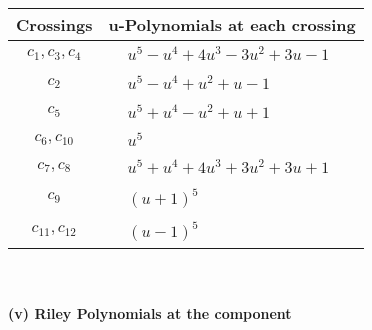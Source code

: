 \documentclass[1p]{elsarticle_modified}
\theoremstyle{definition}
\begin{document}
\begin{tabular}{m{50pt}|m{274pt}}
Crossings & \hspace{64pt}u-Polynomials at each crossing \\
\hline $$\begin{aligned}c_{1},c_{3},c_{4}\end{aligned}$$&$\begin{aligned}
&u^5- u^4+4 u^3-3 u^2+3 u-1
\end{aligned}$\\
\hline $$\begin{aligned}c_{2}\end{aligned}$$&$\begin{aligned}
&u^5- u^4+u^2+u-1
\end{aligned}$\\
\hline $$\begin{aligned}c_{5}\end{aligned}$$&$\begin{aligned}
&u^5+u^4- u^2+u+1
\end{aligned}$\\
\hline $$\begin{aligned}c_{6},c_{10}\end{aligned}$$&$\begin{aligned}
&u^5
\end{aligned}$\\
\hline $$\begin{aligned}c_{7},c_{8}\end{aligned}$$&$\begin{aligned}
&u^5+u^4+4 u^3+3 u^2+3 u+1
\end{aligned}$\\
\hline $$\begin{aligned}c_{9}\end{aligned}$$&$\begin{aligned}
&(u+1)^5
\end{aligned}$\\
\hline $$\begin{aligned}c_{11},c_{12}\end{aligned}$$&$\begin{aligned}
&(u-1)^5
\end{aligned}$\\
\hline
\end{tabular}\\~\\
\newpage\renewcommand{\arraystretch}{1}
\flushleft \textbf{(v) Riley Polynomials at the component}\newline \\
\end{document}

